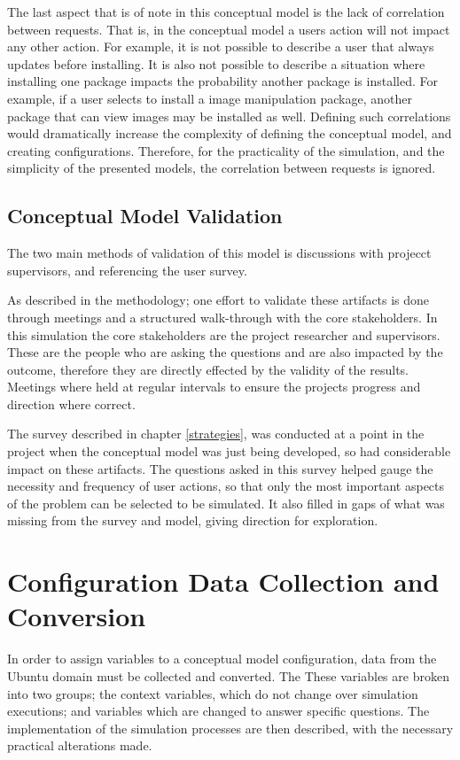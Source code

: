 The last aspect that is of note in this conceptual model is the lack of correlation between requests.
That is, in the conceptual model a users action will not impact any other action. 
For example, it is not possible to describe a user that always updates before installing. 
It is also not possible to describe a situation where installing one package impacts the probability another package is installed.
For example, if a user selects to install a image manipulation package, another package that can view images may be installed as well.
Defining such correlations would dramatically increase the complexity of defining the conceptual model, and creating configurations.
Therefore, for the practicality of the simulation, and the simplicity of the presented models, the correlation between requests is ignored.

\subsection{Conceptual Model Validation}
The two main methods of validation of this model is discussions with projecct supervisors, and referencing the user survey. 

As described in the methodology; one effort to validate these artifacts is done through meetings and a structured walk-through with the core stakeholders.
In this simulation the core stakeholders are the project researcher and supervisors.
These are the people who are asking the questions and are also impacted by the outcome, therefore they are directly effected by the validity of the results.
Meetings where held at regular intervals to ensure the projects progress and direction where correct.

The survey described in chapter \ref{strategies}, 
was conducted at a point in the project when the conceptual model was just being developed, so had considerable impact on these artifacts.
The questions asked in this survey helped gauge the necessity and frequency of user actions,
so that only the most important aspects of the problem can be selected to be simulated.
It also filled in gaps of what was missing from the survey and model, giving direction for exploration.



\section{Configuration Data Collection and Conversion}
\label{sim.collection}
In order to assign variables to a conceptual model configuration, data from the Ubuntu domain must be collected and converted.
The 
These variables are broken into two groups; the context variables, which do not change over simulation executions; 
and variables which are changed to answer specific questions.
The implementation of the simulation processes are then described, with the necessary practical alterations made. 

